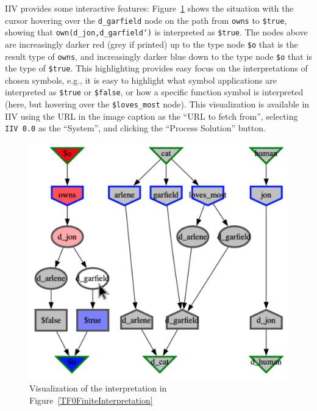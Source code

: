 \documentclass[letterpaper]{article}
\newcommand{\smalltt}[1]{\small \texttt{#1}}
\begin{document}
IIV provides some interactive features: Figure~\ref{TF0FiniteIIV} shows the situation with the 
cursor hovering over the {\smalltt{d\_garfield}} node on the path from {\smalltt{owns}} to 
{\smalltt{\$true}}, showing that {\smalltt{own(d\_jon,d\_garfield`)}} is interpreted as 
{\smalltt{\$true}}.
The nodes above are increasingly darker red (grey if printed) up to the type node {\smalltt{\$o}} 
that is the result type of {\smalltt{owns}}, and increasingly darker blue down to the type node 
{\smalltt{\$o}} that is the type of {\smalltt{\$true}}.
This highlighting provides easy focus on the interpretations of chosen symbols, e.g., it is easy
to highlight what symbol applications are interpreted as {\smalltt{\$true}} or {\smalltt{\$false}},
or how a specific function symbol is interpreted (here, but hovering over the 
{\smalltt{\$loves\_most}} node).
This visualization is available in IIV using the URL in the image caption
as the ``URL to fetch from'',
selecting {\tt IIV 0.0} as the ``System'', and clicking the ``Process Solution'' button.

\begin{figure}[htbp]
\centering
\includegraphics[width=\columnwidth]{IIVGraph.pdf}
\caption{Visualization of the interpretation in Figure~\ref{TF0FiniteInterpretation}}
\label{TF0FiniteIIV}
\end{figure}
\end{document}
